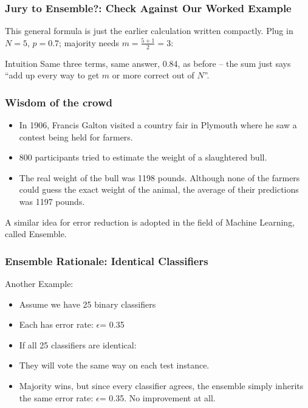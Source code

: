 \begin{frame}[fragile]\frametitle{Jury to Ensemble?: Check Against Our Worked Example}
This general formula is just the earlier calculation written compactly. Plug in $N=5$, $p=0.7$; majority needs $m = \frac{5+1}{2} = 3$:
\begin{center}
\end{center}
\begin{block}{Intuition}
Same three terms, same answer, 0.84, as before -- the sum just says ``add up every way to get $m$ or more correct out of $N$''.
\end{block}
\end{frame}

\begin{frame}[fragile]\frametitle{Wisdom of the crowd}
\begin{itemize}
\item In 1906, Francis Galton visited a country fair in Plymouth where he saw a contest being held for farmers. 
\item  800 participants tried to estimate the weight of a slaughtered bull. 
\item  The real weight of the bull was 1198 pounds. Although none of the farmers could guess the exact weight of the animal, the average of their predictions was 1197 pounds.
\end{itemize}
A similar idea for error reduction is adopted in the field of Machine Learning, called Ensemble.

\end{frame}


\begin{frame}[fragile]\frametitle{Ensemble Rationale: Identical Classifiers}
Another Example:
\begin{itemize}
\item Assume we have 25 binary classifiers
\item Each has error rate: $\epsilon$= 0.35
\item If all 25 classifiers are identical:
\item They will vote the same way on each test instance.
\item Majority wins, but since every classifier agrees, the ensemble simply inherits the same error rate: $\epsilon$= 0.35. No improvement at all.
\end{itemize}
\end{frame}

